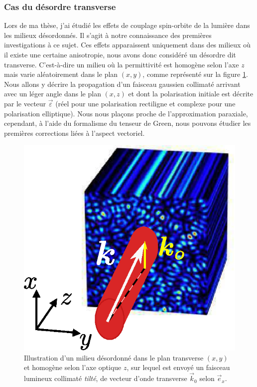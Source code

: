 \documentclass[a4paper,11pt]{article} %
\begin{document}
	
	\subsubsection{Cas du désordre transverse}
	
	Lors de ma thèse, j'ai étudié les effets de couplage spin-orbite de la lumière dans les milieux désordonnés. Il s'agit à notre connaissance des premières investigations à ce sujet. Ces effets apparaissent uniquement dans des milieux où il existe une certaine anisotropie, nous avons donc considéré un désordre dit transverse. C'est-à-dire un milieu où la permittivité est homogène selon l'axe $ z $ mais varie aléatoirement dans le plan $ (x,y) $, comme représenté sur la figure \ref{fig:systeme_desordre_transverse}. Nous allons y décrire la propagation d'un faisceau gaussien collimaté arrivant avec un léger angle dans le plan $ (x,z) $ et dont la polarisation initiale est décrite par le vecteur $ \vec{\varepsilon} $ (réel pour une polarisation rectiligne et complexe pour une polarisation elliptique). Nous nous plaçons proche de l'approximation paraxiale, cependant, à l'aide du formalisme du tenseur de Green, nous pouvons étudier les premières corrections liées à l'aspect vectoriel.
	
	\begin{figure}[h]
		\centering
		\begin{minipage}[c]{0.85\linewidth}
			\centering
			\includegraphics[width=0.35\linewidth]{./Illustrations/2+1disorder.eps}
			\caption{Illustration d'un milieu désordonné dans le plan transverse $ (x,y) $ et homogène selon l'axe optique $ z $, sur lequel est envoyé un faisceau lumineux collimaté \textit{tilté}, de vecteur d'onde transverse $ \vec{k}_0 $ selon $ \vec{e}_x $.}
			\label{fig:systeme_desordre_transverse}
		\end{minipage}
	\end{figure}
	
\end{document}
